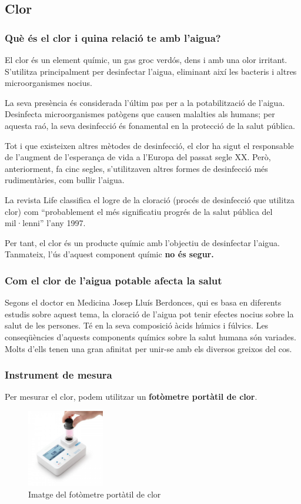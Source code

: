 \subsection{Clor} \label{subsec:clor}
\subsubsection{Què és el clor i quina relació te amb l'aigua?}
El clor és un element químic, un gas groc verdós, dens i amb una olor irritant. S'utilitza principalment per desinfectar l'aigua, eliminant així les bacteris i altres microorganismes nocius.

La seva presència és considerada l'últim pas per a la potabilització de l'aigua. Desinfecta microorganismes patògens que causen malalties als humans; per aquesta raó, la seva desinfecció és fonamental en la protecció de la salut pública.

Tot i que existeixen altres mètodes de desinfecció, el clor ha sigut el responsable de l'augment de l'esperança de vida a l'Europa del passat segle XX. Però, anteriorment, fa cinc segles, s'utilitzaven altres formes de desinfecció més rudimentàries, com bullir l'aigua.

La revista Life \cite{RevistaLife} classifica el logre de la cloració (procés de desinfecció que utilitza clor) com “probablement el més significatiu progrés de la salut pública del mil·lenni” l'any 1997.

Per tant, el clor és un producte químic amb l'objectiu de desinfectar l'aigua. Tanmateix, l'ús d'aquest component químic \textbf{no és segur.}
\subsubsection{Com el clor de l'aigua potable afecta la salut}
Segons el doctor en Medicina Josep Lluís Berdonces, qui es basa en diferents estudis sobre aquest tema, la cloració de l’aigua pot tenir efectes nocius sobre la salut de les persones. Té en la seva composició àcids húmics i fúlvics. Les conseqüències d’aquests components químics sobre la salut humana són variades. Molts d’ells tenen una gran afinitat per unir-se amb els diversos greixos del cos. \cite{Clor}
\subsubsection{Instrument de mesura}
Per mesurar el clor, podem utilitzar un \textbf{fotòmetre portàtil de clor}.
\begin{figure}[H]
\centering
\includegraphics[width=0.3\textwidth]{./Figures/Cloro.jpg}
\caption{Imatge del fotòmetre portàtil de clor}
\label{fig:clormetre}
\end{figure}

